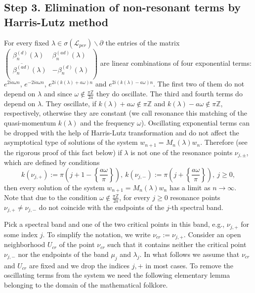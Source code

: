 \documentclass[a4paper,oneside,12pt]{amsart}
\begin{document}
\subsection*{Step 3. Elimination of non-resonant terms by Harris-Lutz method}
For every fixed $\lambda\in\sigma(\mathcal L_{per})\backslash\partial$ the entries of the matrix
$\left(\begin{array}{cc}
\beta_n^{(d)}(\lambda) & \beta_n^{(ad)}(\lambda) \\
\overline{\beta_n^{(ad)}}(\lambda) & -\beta_n^{(d)}(\lambda) \\
\end{array}\right)$
are linear combinations of four exponential terms: $e^{2ia\omega n}$, $e^{-2ia\omega n}$, $e^{2i(k(\lambda)+a\omega)n}$ and $e^{2i(k(\lambda)-a\omega)n}$. The first two of them do not depend on $\lambda$ and since $\omega\notin\frac{\pi\mathbb Z}{2a}$ they do oscillate. The third and fourth terms do depend on $\lambda$. They oscillate, if $k(\lambda)+a\omega\notin\pi\mathbb Z$ and $k(\lambda)-a\omega\notin\pi\mathbb Z$, respectively, otherwise they are constant (we call resonance this matching of the quasi-momentum $k(\lambda)$ and the frequency $\omega$). Oscillating exponential terms can be dropped with the help of Harris-Lutz transformation and do not affect the asymptotical type of solutions of the system $w_{n+1}=M_n(\lambda)w_n$. Therefore (see the rigorous proof of this fact below) if $\lambda$ is not one of the resonance points $\nu_{j,\pm}$, which are defined by conditions
\begin{equation*}
    k(\nu_{j,+}):=\pi\left(j+1-\left\{\frac{a\omega}{\pi}\right\}\right),
    \
    k(\nu_{j,-}):=\pi\left(j+\left\{\frac{a\omega}{\pi}\right\}\right),
    \
    j\ge0,
\end{equation*}
then every solution of the system $w_{n+1}=M_n(\lambda)w_n$ has a limit as $n\rightarrow\infty$. Note that due to the condition $\omega\notin\frac{\pi\mathbb Z}{2a}$, for every $j\ge0$ resonance points $\nu_{j,+}\neq\nu_{j,-}$ do not coincide with the endpoints of the $j$-th spectral band.

Pick a spectral band and one of the two critical points in this band, e.g., $\nu_{j,+}$ for some index $j$. To simplify the notation, we write $\nu_{cr}:=\nu_{j,+}$. Consider an open neighborhood $U_{cr}$ of the point $\nu_{cr}$ such that it contains neither the critical point $\nu_{j,-}$ nor the endpoints of the band $\mu_j$ and $\lambda_j$. In what follows we assume that $\nu_{cr}$ and $U_{cr}$ are fixed and we drop the indices $j,+$ in most cases. To remove the oscillating terms from the system we need the following elementary lemma belonging to the domain of the mathematical folklore.
\end{document}
